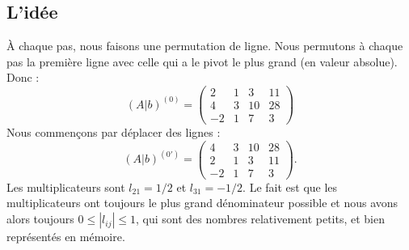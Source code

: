 \subsection{L'idée}

À chaque pas, nous faisons une permutation de ligne. Nous permutons à chaque pas la première ligne avec celle qui a le pivot le plus grand (en valeur absolue). Donc :
\begin{equation}
    (A|b)^{(0)}=\begin{pmatrix}
         2   &   1    &   3    &   11    \\
         4   &   3    &   10    &   28    \\
         -2   &   1    &   7    &   3
     \end{pmatrix}
\end{equation}
Nous commençons par déplacer des lignes :
\begin{equation}
    (A|b)^{(0')}=\begin{pmatrix}
         4   &   3    &   10    &   28    \\
         2   &   1    &   3    &   11    \\
         -2   &   1    &   7    &   3
     \end{pmatrix}.
\end{equation}
Les multiplicateurs sont \( l_{21}=1/2\) et \( l_{31}=-1/2\). Le fait est que les multiplicateurs ont toujours le plus grand dénominateur possible et nous avons alors toujours \( 0\leq | l_{ij} |\leq 1\), qui sont des nombres relativement petits, et bien représentés en mémoire.

